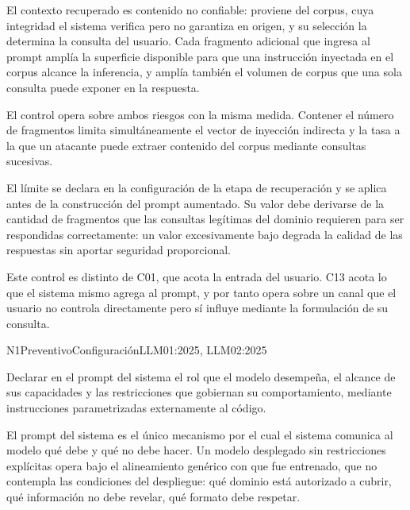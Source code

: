 El contexto recuperado es contenido no confiable: proviene del corpus, cuya integridad el sistema verifica pero no garantiza en origen, y su selección la determina la consulta del usuario. Cada fragmento adicional que ingresa al prompt amplía la superficie disponible para que una instrucción inyectada en el corpus alcance la inferencia, y amplía también el volumen de corpus que una sola consulta puede exponer en la respuesta.

El control opera sobre ambos riesgos con la misma medida. Contener el número de fragmentos limita simultáneamente el vector de inyección indirecta y la tasa a la que un atacante puede extraer contenido del corpus mediante consultas sucesivas.

El límite se declara en la configuración de la etapa de recuperación y se aplica antes de la construcción del prompt aumentado. Su valor debe derivarse de la cantidad de fragmentos que las consultas legítimas del dominio requieren para ser respondidas correctamente: un valor excesivamente bajo degrada la calidad de las respuestas sin aportar seguridad proporcional.

Este control es distinto de C01, que acota la entrada del usuario. C13 acota lo que el sistema mismo agrega al prompt, y por tanto opera sobre un canal que el usuario no controla directamente pero sí influye mediante la formulación de su consulta.


  {N1}{Preventivo}{Configuración}{LLM01:2025, LLM02:2025}

Declarar en el prompt del sistema el rol que el modelo desempeña, el alcance de sus capacidades y las restricciones que gobiernan su comportamiento, mediante instrucciones parametrizadas externamente al código.

El prompt del sistema es el único mecanismo por el cual el sistema comunica al modelo qué debe y qué no debe hacer. Un modelo desplegado sin restricciones explícitas opera bajo el alineamiento genérico con que fue entrenado, que no contempla las condiciones del despliegue: qué dominio está autorizado a cubrir, qué información no debe revelar, qué formato debe respetar.

